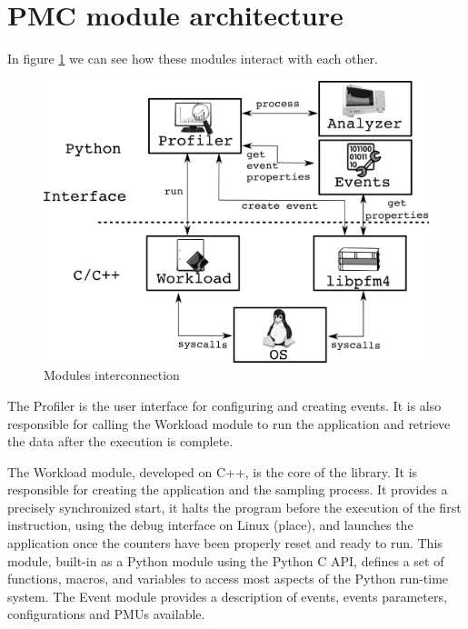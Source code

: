 
\section{PMC module architecture} \label{sec:PMC_tool_architecture}

In figure \ref{fig:achitecture} we can see how these modules interact with each other.
\begin{figure}[H]
    \centering
    \includegraphics[width=\textwidth]{fingerprint/figures/architecture.png}
    \caption{Modules interconnection}
    \label{fig:achitecture}
\end{figure}

The Profiler is the user interface for configuring and creating events.
It is also responsible for calling the Workload module to run the application and retrieve the data after the execution is complete.

The Workload module, developed on C++, is the core of the library.
It is responsible for creating the application and the sampling process.
It provides a precisely synchronized start, it halts the program before the execution of the first instruction, using the debug interface on Linux (place), and launches the application once the counters have been properly reset and ready to run.
This module, built-in as a Python module using the Python C API, defines a set of functions, macros, and variables to access most aspects of the Python run-time system.
The Event module provides a description of events, events parameters, configurations and PMUs available.

